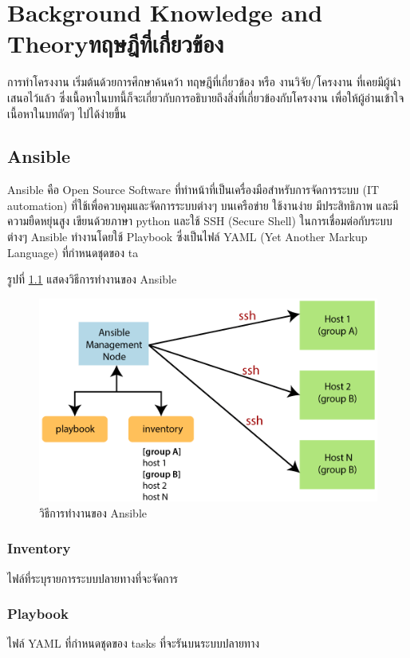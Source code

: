 \chapter{\ifenglish Background Knowledge and Theory\else ทฤษฎีที่เกี่ยวข้อง\fi}

การทำโครงงาน เริ่มต้นด้วยการศึกษาค้นคว้า ทฤษฎีที่เกี่ยวข้อง หรือ งานวิจัย/โครงงาน ที่เคยมีผู้นำเสนอไว้แล้ว ซึ่งเนื้อหาในบทนี้ก็จะเกี่ยวกับการอธิบายถึงสิ่งที่เกี่ยวข้องกับโครงงาน เพื่อให้ผู้อ่านเข้าใจเนื้อหาในบทถัดๆ ไปได้ง่ายขึ้น

\section{Ansible}
Ansible คือ Open Source Software ที่ทำหน้าที่เป็นเครื่องมือสำหรับการจัดการระบบ (IT automation) ที่ใช้เพื่อควบคุมและจัดการระบบต่างๆ บนเครือข่าย ใช้งานง่าย มีประสิทธิภาพ และมีความยืดหยุ่นสูง เขียนด้วยภาษา python และใช้ SSH (Secure Shell) ในการเชื่อมต่อกับระบบต่างๆ Ansible ทำงานโดยใช้ Playbook ซึ่งเป็นไฟล์ YAML (Yet Another Markup Language) ที่กำหนดชุดของ ta

รูปที่ \ref{fig:ansible_works} แสดงวิธีการทำงานของ Ansible
\begin{figure}
  \begin{center}
    \includegraphics[scale=0.7]{ansible-works.png}
  \end{center}
  \caption[Poem]{วิธีการทำงานของ Ansible}
  \label{fig:ansible_works}
\end{figure}

\subsection{Inventory}
ไฟล์ที่ระบุรายการระบบปลายทางที่จะจัดการ
\subsection{Playbook}
ไฟล์ YAML ที่กำหนดชุดของ tasks ที่จะรันบนระบบปลายทาง
